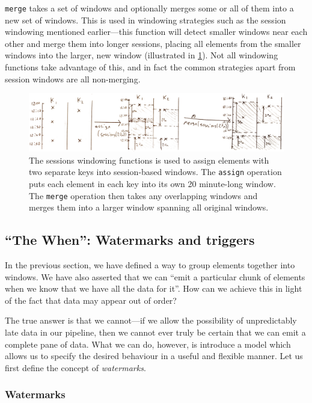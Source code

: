 \texttt{merge} takes a set of windows and optionally merges some or all of them into a new set of windows.
This is used in windowing strategies such as the session windowing mentioned earlier---this function will detect smaller windows near each other and merge them into longer sessions, placing all elements from the smaller windows into the larger, new window (illustrated in \cref{fig:prep:sessions-merge}).
Not all windowing functions take advantage of this, and in fact the common strategies apart from session windows are all non-merging.

\begin{figure}[t]
	\includegraphics[width=\textwidth]{images/temp/sessions-assign-merge}
	\caption{The sessions windowing functions is used to assign elements with two separate keys into session-based windows. The \texttt{assign} operation puts each element in each key into its own 20 minute-long window. The \texttt{merge} operation then takes any overlapping windows and merges them into a larger window spanning all original windows.}
	\label{fig:prep:sessions-merge}
\end{figure}


\subsection{``The When'': Watermarks and triggers}\label{sec:prep:dataflow:when}

In the previous section, we have defined a way to group elements together into windows.
We have also asserted that we can ``emit a particular chunk of elements when we know that we have all the data for it''.
How can we achieve this in light of the fact that data may appear out of order?

The true answer is that we cannot---if we allow the possibility of unpredictably late data in our pipeline, then we cannot ever truly be certain that we can emit a complete pane of data.
What we can do, however, is introduce a model which allows us to specify the desired behaviour in a useful and flexible manner.
Let us first define the concept of \emph{watermarks}.

\subsubsection{Watermarks}

